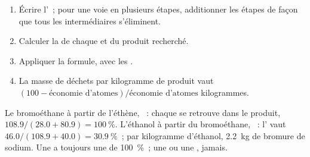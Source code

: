 \begin{method}\label{met:g12:synthesis-strategy:atom-economy}
\begin{enumerate}
  \item Écrire l'~; pour une voie en plusieurs étapes,
        additionner les étapes de façon que tous les intermédiaires
        s'éliminent.
  \item Calculer la  de chaque  et du produit
        recherché.
  \item Appliquer la formule, avec les .
  \item La masse de déchets par kilogramme de produit vaut
        $(100 - \text{économie d'atomes})/\text{économie d'atomes}$ kilogrammes.
\end{enumerate}
\end{method}

\begin{example}\label{ex:g12:synthesis-strategy:compare}
Le bromoéthane à partir de l'éthène, ~: chaque
 se retrouve
dans le produit,  $108.9/(28.0 + 80.9) = \qty{100}{\percent}$.
L'éthanol à partir du bromoéthane, ~:
l' vaut $46.0/(108.9 + 40.0) = \qty{30.9}{\percent}$~;
par kilogramme d'éthanol, \qty{2.2}{kg} de bromure de sodium. Une
 a toujours une  de \qty{100}{\percent}~; une
 ou une , jamais.
\end{example}

